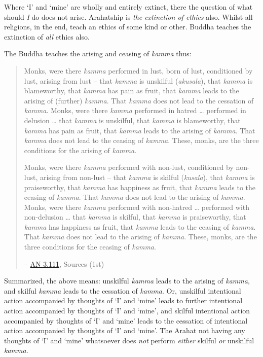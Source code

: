 Where `I' and `mine' are wholly and entirely extinct, there the question of what should \emph{I} do does not arise. Arahatship is \emph{the extinction of ethics} also. Whilst all religions, in the end, teach an ethics of some kind or other. Buddha teaches the extinction of \emph{all} ethics also.

The Buddha teaches the arising and ceasing of \textit{kamma} thus:

\begin{quote}
Monks, were there \textit{kamma} performed in lust, born of lust, conditioned by lust, arising from lust -- that \textit{kamma} is unskilful (\textit{akusala}), that \textit{kamma} is blameworthy, that \textit{kamma} has pain as fruit, that \textit{kamma} leads to the arising of (further) \textit{kamma}. That \textit{kamma} does not lead to the cessation of \textit{kamma}. Monks, were there \textit{kamma} performed in hatred \ldots{} performed in delusion \ldots{} that \textit{kamma} is unskilful, that \textit{kamma} is blameworthy, that \textit{kamma} has pain as fruit, that \textit{kamma} leads to the arising of \textit{kamma}. That \textit{kamma} does not lead to the ceasing of \textit{kamma}. These, monks, are the three conditions for the arising of \textit{kamma}.

Monks, were there \textit{kamma} performed with non-lust, conditioned by non-lust, arising from non-lust -- that \textit{kamma} is skilful (\textit{kusala}), that \textit{kamma} is praiseworthy, that \textit{kamma} has happiness as fruit, that \textit{kamma} leads to the ceasing of \textit{kamma}. That \textit{kamma} does not lead to the arising of \textit{kamma}. Monks, were there \textit{kamma} performed with non-hatred \ldots{} performed with non-delusion \ldots{} that \textit{kamma} is skilful, that \textit{kamma} is praiseworthy, that \textit{kamma} has happiness as fruit, that \textit{kamma} leads to the ceasing of \textit{kamma}. That \textit{kamma} does not lead to the arising of \textit{kamma}. These, monks, are the three conditions for the ceasing of \textit{kamma}.

 -- \href{https://suttacentral.net/an3.111/en/sujato}{AN 3.111}, Sources (1st)
\end{quote}

Summarized, the above means: unskilful \textit{kamma} leads to the arising of \textit{kamma}, and skilful \textit{kamma} leads to the cessation of \textit{kamma}. Or, unskilful intentional action accompanied by thoughts of `I' and `mine' leads to further intentional action accompanied by thoughts of `I' and `mine', and skilful intentional action accompanied by thoughts of `I' and `mine' leads to the cessation of intentional action accompanied by thoughts of `I' and `mine'. The Arahat not having any thoughts of `I' and `mine' whatsoever does \emph{not} perform \emph{either} skilful \emph{or} unskilful \textit{kamma}.

